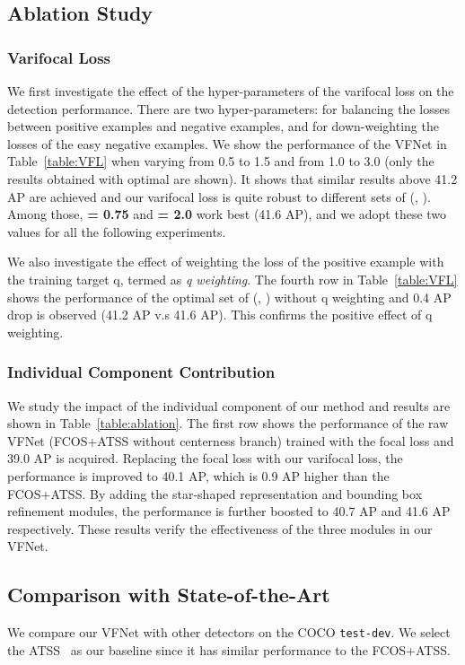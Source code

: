 \vspace{0.3mm}
\subsection{Ablation Study}
\subsubsection{Varifocal Loss}
We first investigate the effect of the hyper-parameters of the varifocal loss on the detection performance. There are two hyper-parameters: \textbf{} for balancing the losses between positive examples and negative examples, and \textbf{} for down-weighting the losses of the easy negative examples. 
We show the performance of the VFNet in Table~\ref{table:VFL} when varying  from 0.5 to 1.5 and  from 1.0 to 3.0 (only the results obtained with optimal   are shown). It shows that similar results above 41.2 AP are achieved and our varifocal loss is quite robust to different sets of (, ). Among those, \textbf{ = 0.75} and \textbf{ = 2.0} work best (41.6 AP), and we adopt these two values for all the following experiments.

We also investigate the effect of weighting the loss of the positive example with the training target q, termed as \textit{q weighting}. The fourth row in Table~\ref{table:VFL} shows the performance of the optimal set of (, ) without q weighting and 0.4 AP drop is observed (41.2 AP v.s 41.6 AP). This confirms the positive effect of q weighting.

\vspace{-3mm}
\subsubsection{Individual Component Contribution}

We study the impact of the individual component of our method and results are shown in Table~\ref{table:ablation}. The first row shows the performance of the raw VFNet (FCOS+ATSS without centerness branch) trained with the focal loss and 39.0 AP is acquired. Replacing the focal loss with our varifocal loss, the performance is improved to 40.1 AP, which is 0.9 AP higher than the FCOS+ATSS. By adding the star-shaped representation and bounding box refinement modules, the performance is further boosted to 40.7 AP and 41.6 AP respectively. These results verify the effectiveness of the three modules in our VFNet. 



\subsection{Comparison with State-of-the-Art}
We compare our VFNet with other detectors on the COCO \texttt{test-dev}. We select the ATSS~\cite{ATSS} as our baseline since it has similar performance to the FCOS+ATSS.

